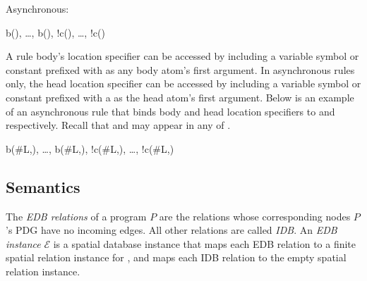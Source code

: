Asynchronous:

\begin{Drules}
        {b(), \ldots, b(), !c(), \ldots, !c()}
\end{Drules}

A rule body's location specifier can be accessed by including a variable symbol or constant prefixed with \dedalus{#} as any body atom's first argument.  In asynchronous rules only, the head location specifier can be accessed by including a variable symbol or constant prefixed with a \dedalus{#} as the head atom's first argument.  Below is an example of an asynchronous rule that binds body and head location specifiers to  and  respectively.  Recall that  and  may appear in any of .

\begin{Drules}
        {b(#L,), \ldots, b(#L,), !c(#L,), \ldots, !c(#L,)}
\end{Drules}





\subsection{Semantics}
The {\em EDB relations} of a \lang program $P$ are the relations whose corresponding nodes $P$'s PDG have no incoming edges.  All other relations are called {\em IDB}.
An {\em EDB instance} $\mathcal{E}$ is a spatial database instance that maps each EDB relation  to a finite spatial relation instance for , and maps each IDB relation  to the empty spatial relation instance.

